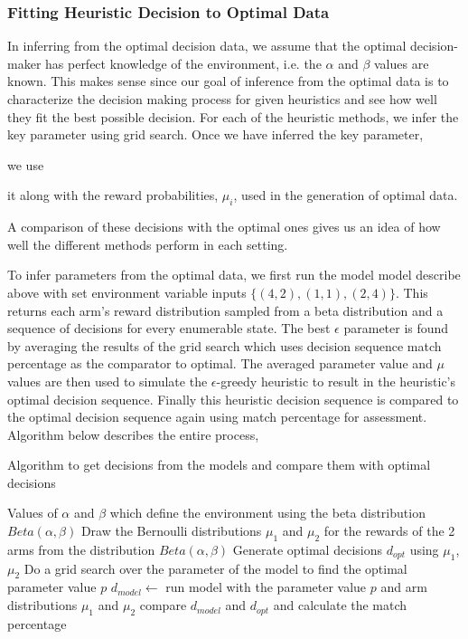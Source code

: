 \subsubsection{Fitting Heuristic Decision to Optimal Data}
In inferring from the optimal decision data, we assume that the optimal decision-maker has perfect knowledge of the environment, i.e. the $\alpha$ and $\beta$ values are known. This makes sense since our goal of inference from the optimal data is to characterize the decision making process for given heuristics and see how well they fit the best possible decision. For each of the heuristic methods, we infer the key parameter using grid search. Once we have inferred the key parameter, 

we use 


it along with the reward probabilities, $\mu_i$, used in the generation of optimal data. 


A comparison of these decisions with the optimal ones gives us an idea of how well the different methods perform in each setting. 

To infer parameters from the optimal data, we first run the model model describe above with set environment variable inputs $\{(4,2), (1,1), (2,4)\}$. This returns each arm's reward distribution sampled from a beta distribution and a sequence of decisions for every enumerable state. The best $\epsilon$ parameter is found by averaging the results of the grid search which uses decision sequence match percentage as the comparator to optimal. The averaged parameter value and $\mu$ values are then used to simulate the $\epsilon$-greedy heuristic to result in the heuristic's optimal decision sequence. Finally this heuristic decision sequence is compared to the optimal decision sequence again using match percentage for assessment.
Algorithm below describes the entire process,
\begin{algorithm}[H]
\caption{Algorithm to get decisions from the models and compare them with optimal decisions}
\label{algoOptimalModelComparison}
\renewcommand{\algorithmicrequire}{\textbf{Input:}}
\renewcommand{\algorithmicensure}{\textbf{Output:}}
\begin{algorithmic}[1]
		\REQUIRE Values of $\alpha$ and $\beta$ which define the environment using the beta distribution $Beta(\alpha,\beta)$
	\STATE Draw the Bernoulli distributions $\mu_1$ and $\mu_2$ for the rewards of the 2 arms from the distribution $Beta(\alpha,\beta)$
	\STATE Generate optimal decisions $d_{opt}$ using $\mu_1$, $\mu_2$
			\STATE Do a grid search over the parameter of the model to find the optimal parameter value $p$
			\STATE $d_{model} \leftarrow $ run model with the parameter value $p$ and arm distributions $\mu_1$ and $\mu_2$
			\STATE compare $d_{model}$ and $d_{opt}$ and calculate the match percentage
		\ENDFOR
\end{algorithmic}
\end{algorithm}

